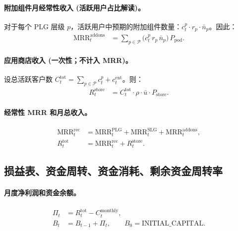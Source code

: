 \documentclass[11点, A4纸, 单面]{article}
\begin{document}
\paragraph{附加组件月经常性收入 (活跃用户占比解读)。}
对于每个 PLG 层级 $p$，活跃用户中预期的附加组件数量：$c^p_t \cdot r_p \cdot \bar{n}_p$。因此：
\begin{align}
\mathrm{MRR}^{\mathrm{addons}}_t 
  &= \sum_{p \in \mathcal{P}} \bigl(c^p_t \, r_p \, \bar{n}_p\bigr)\, P_{\mathrm{pod}}.
\end{align}

\paragraph{应用商店收入 (一次性；不计入 MRR)。}
设总活跃客户数 $C^{\mathrm{tot}}_t = \sum_{p \in \mathcal{P}} c^p_t + c^{\mathrm{ent}}_t$。则：
\begin{align}
R^{\mathrm{store}}_t 
  &= C^{\mathrm{tot}}_t \cdot \rho \cdot \bar{u} \cdot P_{\mathrm{store}}.
\end{align}

\paragraph{经常性 MRR 和月总收入。}
\begin{align}
\mathrm{MRR}^{\mathrm{rec}}_t 
  &= \mathrm{MRR}^{\mathrm{PLG}}_t + \mathrm{MRR}^{\mathrm{SLG}}_t + \mathrm{MRR}^{\mathrm{addons}}_t,\\
R^{\mathrm{tot}}_t 
  &= \mathrm{MRR}^{\mathrm{rec}}_t + R^{\mathrm{store}}_t.
\end{align}

\subsection{损益表、资金周转、资金消耗、剩余资金周转率}
\paragraph{月度净利润和资金余额。}
\begin{align}
\Pi_t &= R^{\mathrm{tot}}_t - C^{\mathrm{monthly}}_t,\\
B_t &= B_{t-1} + \Pi_t, \qquad B_0 = \text{INITIAL\_CAPITAL}.
\end{align}
\end{document}
